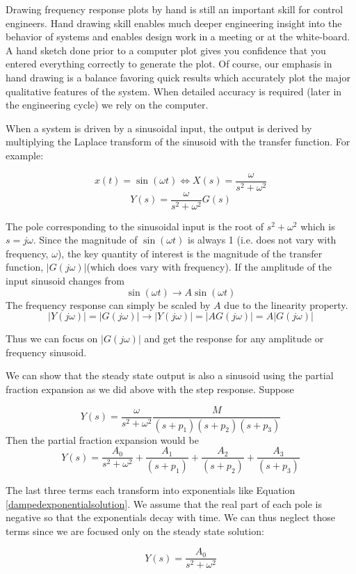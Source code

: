 Drawing frequency response plots by hand is still an important skill for control engineers.  Hand drawing skill enables much deeper engineering insight into the behavior of systems and enables design work in a meeting or at the white-board.  A hand sketch done prior to a computer plot gives you confidence that you entered everything correctly to generate the plot.  Of course, our emphasis in hand drawing  is   a balance favoring quick results which accurately plot the major qualitative features of the system.  When detailed accuracy is required (later in the engineering cycle) we rely on the computer.

When a system is driven by a sinusoidal input, the output is derived by multiplying the Laplace transform of the sinusoid with the transfer function.  For example:


\[
x(t) = \sin(\omega t)   \Leftrightarrow X(s) = \frac{\omega}{s^2 + \omega^2}
\]
\[
Y(s) =  \frac{\omega}{s^2 + \omega^2} G(s)
\]

The pole corresponding to the sinusoidal input is the root of $s^2+\omega^2$ which is $s=j\omega$.  Since the magnitude of $\sin(\omega t)$ is always 1 (i.e. does not vary with frequency, $\omega$), the key quantity of interest  is the magnitude of the  transfer function, $|G(j\omega)|$(which does vary with frequency).  If the amplitude of the input sinusoid changes from
\[
\sin(\omega t) \to A\sin(\omega t)
\]
The frequency response can simply be scaled by $A$ due to the linearity property.
\[
|Y(j\omega)| = |G(j\omega)| \to |Y(j\omega)| =|AG(j\omega)|=A|G(j\omega)|
\]

Thus we can focus on $|G(j\omega)|$ and get the response for any amplitude or frequency sinusoid.

We can show that the steady state output is also a sinusoid using the partial fraction expansion as we did above with the step response.   Suppose

\[
Y(s) = \frac{\omega}{s^2 + \omega^2} \frac  {M}   {(s+p_1)(s+p_2)(s+p_3)}
\]
Then the partial fraction expansion would be
\[
Y(s) =  \frac{A_0} {s^2+\omega^2} +  \frac{A_1} {(s+p_1)} +  \frac{A_2} {(s+p_2)} +  \frac{A_3} {(s+p_3)}
\]

The last three terms each transform into exponentials like Equation \ref{dampedexponentialsolution}.
We assume that the real part of each pole is negative so that the exponentials decay with time.   We can thus neglect those terms since we are focused only on the steady state solution:


\[
Y(s) =  \frac{A_0} {s^2+\omega^2}
\]

